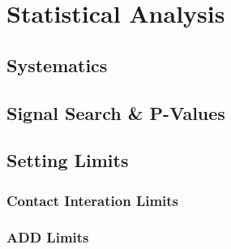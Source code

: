 \chapter{Statistical Analysis}


\section{Systematics}


\section{Signal Search \& P-Values}



\section{Setting Limits}

\subsection{Contact Interation Limits}

\subsection{ADD Limits}


